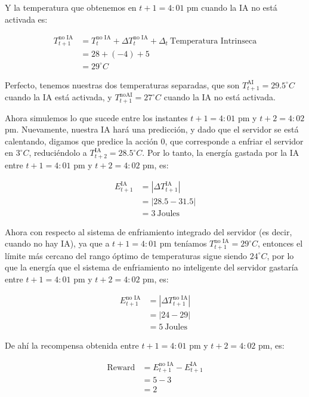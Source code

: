 \documentclass[
]{book}
\begin{document}
Y la temperatura que obtenemos en \(t + 1 = 4: 01\) pm cuando la IA no está activada es:

\begin{align*}
    T_{t+1}^{\textrm{no IA}}
    & = T_t^{\textrm{no IA}} + \Delta T_t^{\textrm{no IA}} + \Delta_t \ \textrm{Temperatura Intrinseca} \\
    & = 28 + (-4) + 5 \\
    & = 29^{\circ} C
\end{align*}

Perfecto, tenemos nuestras dos temperaturas separadas, que son \(T_{t+1}^{\textrm{AI}} = 29.5^{\circ} C\) cuando la IA está activada, y \(T_{t+1}^{\textrm{noAI}} = 27^{\circ} C\) cuando la IA no está activada.

Ahora simulemos lo que sucede entre los instantes \(t + 1 = 4:01\) pm y \(t + 2 = 4:02\) pm. Nuevamente, nuestra IA hará una predicción, y dado que el servidor se está calentando, digamos que predice la acción 0, que corresponde a enfriar el servidor en \(3^{\circ} C\), reduciéndolo a \(T_{t + 2}^{\textrm{IA}} = 28.5^{\circ} C\). Por lo tanto, la energía gastada por la IA entre \(t + 1 = 4: 01\) pm y \(t + 2 = 4: 02\) pm, es:

\begin{align*}
    E_{t+1}^{\textrm{IA}}
    & = |\Delta T_{t+1}^{\textrm{IA}}| \\
    & = |28.5 - 31.5| \\
    & = 3 \ \textrm{Joules}
\end{align*}

Ahora con respecto al sistema de enfriamiento integrado del servidor (es decir, cuando no hay IA), ya que a \(t + 1 = 4: 01\) pm teníamos \(T_{t + 1}^{\textrm{no IA}} = 29^{\circ} C\), entonces el límite más cercano del rango óptimo de temperaturas sigue siendo \(24^{\circ} C\), por lo que la energía que el sistema de enfriamiento no inteligente del servidor gastaría entre \(t + 1 = 4: 01\) pm y \(t + 2 = 4 : 02\) pm, es:

\begin{align*}
    E_{t+1}^{\textrm{no IA}}
    & = |\Delta T_{t+1}^{\textrm{no IA}}| \\
    & = |24 - 29| \\
    & = 5 \ \textrm{Joules}
\end{align*}

De ahí la recompensa obtenida entre \(t+1 = 4:01\) pm y \(t+2 = 4:02\) pm, es:

\begin{align*}
    \textrm{Reward}
    & = E_{t+1}^{\textrm{no IA}} - E_{t+1}^{\textrm{IA}} \\
    & = 5 - 3 \\
    & = 2
\end{align*}
\end{document}
